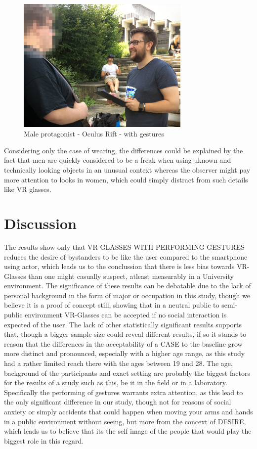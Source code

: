 \documentclass[sigchi]{acmart}
\begin{document}
\begin{figure}[h]
\includegraphics[width=84mm]{IMG_5319_edited.jpg} 
\caption{Male protagonist - Oculus Rift - with gestures}
\end{figure}

Considering only the case of wearing, the differences could be explained by the fact that men are quickly considered to be a freak when using uknown and technically looking objects in an unusual context whereas the observer might pay more attention to looks in women, which could simply distract from such details like VR glasses.
 
\section {Discussion}
The results show only that VR-GLASSES WITH PERFORMING GESTURES reduces the desire of bystanders to be like the user compared to the smartphone using actor, which leads us to the conclussion that there is less bias towards VR-Glasses than one might casually suspect, atleast measurably in a University environment. The significance of these results can be debatable due to the lack of personal background in the form of major or occupation in this study, though we believe it is a proof of concept still, showing that in a neutral public to semi-public environment VR-Glasses can be accepted if no social interaction is expected of the user. The lack of other statistically significant results supports that, though a bigger sample size could reveal different results, if so it stands to reason that the differences in the acceptability of a CASE to the baseline grow more distinct and pronounced, especially with a higher age range, as this study had a rather limited reach there with the ages between 19 and 28. The age, background of the participants and exact setting are probably the biggest factors for the results of a study such as this, be it in the field or in a laboratory. 
Specifically the performing of gestures warrants extra attention, as this lead to the only significant difference in our study, though not for reasons of social anxiety or simply accidents that could happen when moving your arms and hands in a public environment without seeing, but more from the concext of DESIRE, which leads us to believe that its the self image of the people that would play the biggest role in this regard.
\end{document}
